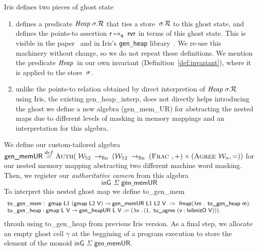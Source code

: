 \begin{assumption}
\label{assumption}
Iris defines two pieces of ghost state
\begin{enumerate}
\item  defines a predicate $\mathit{Heap}\;\sigma.\mathcal{R}$
  that ties a store~$\sigma.\mathcal{R}$ to this ghost state,
  and defines the points-to assertion $\mathsf{r}\mapsto_{\mathsf{q}}\;\mathsf{rv}\mathsf{r}$
  in terms of this ghost state.
  This is visible in the paper~\cite[\S6.3.2]{iris}
  and in Iris's \texttt{gen\_heap} library~\cite{genheap}.
  We re-use this machinery without change,
  so we do not repeat these definitions.
  We mention the predicate $\mathit{Heap}\;\!$
  in our own invariant (Definition~\ref{def:invariant}),
  where it is applied to the \logical store~$\sigma$.
\item unlike the points-to relation obtained by direct interpretion of $\mathit{Heap}\;\sigma.\mathcal{R}$ using Iris, the existing \textsf{gen\_heap\_interp},
  does not directly helps introducing the ghost we define a new algebra (\textsf{gen\_mem\_UR}) for abstracting the nested maps due to different levels of masking in memory mappings and an interpretation for this algebra. 
\end{enumerate}
\end{assumption}

\begin{definition}
We define our custom-tailored algebra 
\newcommand\fpfn{\rightarrow_{\textrm{fin}}}
\( \textsf{gen\_memUR} \stackrel{def}{=}
  \authm(\;
  \Locft \;\fpfn\;
  (\Loctw \;\fpfn\;  (\textsc{Frac }, \mathord{+}) \times (\textsc{Agree } \Loc,\mathord{=}) )
  \)
  for our nested memory mapping abstracting two different machine word masking. Then, we register our \emph{authoritative camera} \cite[\S6.3.3]{iris} from this algebra
  \[\textsf{inG } \Sigma \textsf{ gen\_memUR} \]
  To interpret this nested ghost map we define \textsf{to\_gen\_mem}
  \[
  \begin{array}{l}
    \mathsf{to\_gen\_mem} : \textsf{ gmap L1 }(\textsf{gmap L2 V})\rightarrow \textsf{gen\_memUR L1 L2 V } := \textsf{ fmap} (\lambda \textsf{m . to\_gen\_heap m}). \\
     \mathsf{to\_gen\_heap } : \textsf{gmap L V} \rightarrow \textsf{gen\_heapUR L V} :=  (\lambda \textsf{v }\ldotp (1, \textsf{ to\_agree } (\textsf{v} : \textsf{leibnizO V}))).
  \end{array}
  \]
 throuh using \textsf{to\_gen\_heap} from previous Iris version. 
As a final step, we allocate an empty ghost cell $\gamma$ at the beggining of a program execution to store the element of the monoid $\textsf{inG } \Sigma \textsf{ gen\_memUR}$.
\end{definition}

